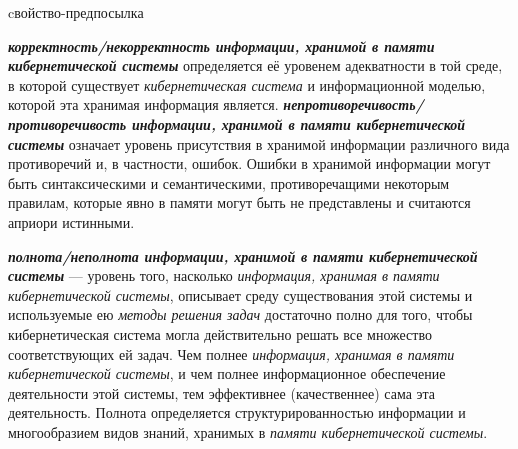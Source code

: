\begin{SCn}
\begin{scnrelfromlist}{cвойство-предпосылка}
\end{scnrelfromlist}
\end{SCn}

\textbf{\textit{корректность/некорректность информации, хранимой в памяти кибернетической системы}} определяется её уровенем адекватности в той среде, в которой существует \textit{кибернетическая система} и информационной моделью, которой эта хранимая информация является. 
\textbf{\textit{непротиворечивость/противоречивость информации, хранимой в памяти кибернетической системы}} означает уровень присутствия в хранимой информации различного вида противоречий и, в частности, ошибок. 
Ошибки в хранимой информации могут быть синтаксическими и семантическими, противоречащими некоторым правилам, которые явно в памяти могут быть не представлены и считаются априори истинными.

\textbf{\textit{полнота/неполнота информации, хранимой в памяти кибернетической системы}} --- уровень того, насколько \textit{информация, хранимая в памяти кибернетической системы}, описывает среду существования этой системы и используемые ею \textit{методы решения задач} достаточно полно для того, чтобы кибернетическая система могла действительно решать все множество соответствующих ей задач. 
Чем полнее \textit{информация, хранимая в памяти кибернетической системы}, и чем полнее информационное обеспечение деятельности этой системы, тем эффективнее (качественнее) сама эта деятельность. 
Полнота определяется структурированностью информации и многообразием видов знаний, хранимых в \textit{памяти кибернетической системы}.

